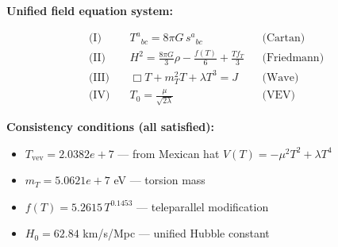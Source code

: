 
\textbf{Unified field equation system:}

\begin{align}
  \text{(I)} \quad & T^a{}_{bc} = 8\pi G \, s^a{}_{bc} && \text{(Cartan)} \\
  \text{(II)} \quad & H^2 = \frac{8\pi G}{3}\rho - \frac{f(T)}{6} + \frac{Tf_T}{3} && \text{(Friedmann)} \\
  \text{(III)} \quad & \Box T + m_T^2 T + \lambda T^3 = J && \text{(Wave)} \\
  \text{(IV)} \quad & T_0 = \frac{\mu}{\sqrt{2\lambda}} && \text{(VEV)}
\end{align}

\textbf{Consistency conditions (all satisfied):}
\begin{itemize}
  \item $T_{\text{vev}} = 2.0382e+7$ — from Mexican hat $V(T) = -\mu^2 T^2 + \lambda T^4$
  \item $m_T = 5.0621e+7$ eV — torsion mass
  \item $f(T) = 5.2615 \, T^{0.1453}$ — teleparallel modification
  \item $H_0 = 62.84$ km/s/Mpc — unified Hubble constant
\end{itemize}